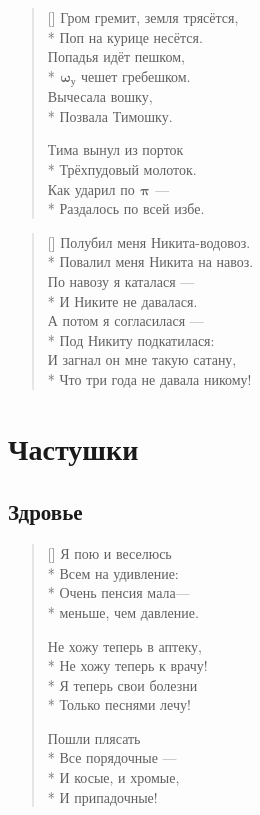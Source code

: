 \documentclass[a4paper,oneside,14pt]{scrbook}
\newcommand{\myPiz}[2]{$^{\text{#1}}${\large{$\boldsymbol{\pi}$}}$_{\text{#2}}$}
\newcommand{\myAss}[2]{$^{\text{#1}}${\large{$\boldsymbol{\omega}$}}$_{\text{#2}}$}
\begin{document}
    \settowidth{\versewidth}{Гром гремит, земля трясётся}
    \begin{verse}[\versewidth]
        Гром гремит, земля трясётся,\\*
        Поп на курице несётся.\\
        Попадья идёт пешком,\\*
        {\myAss{}{у}} чешет гребешком.\\
        Вычесала вошку,\\*
        Позвала Тимошку.
        
        Тима вынул из порток\\*
        Трёхпудовый молоток.\\
        Как ударил по {\myPiz{}{}} ---\\*
        Раздалось по всей избе.
    \end{verse}    

    
    \settowidth{\versewidth}{И загнал он мне такую сатану}
    \begin{verse}[\versewidth]
        Полубил меня Никита-водовоз.\\*
        Повалил меня Никита на навоз.\\
        \vin По навозу я каталася ---\\*
        \vin И Никите не давалася.\\
        А потом я согласилася ---\\*
        Под Никиту подкатилася:\\
        \vin И загнал он мне такую сатану,\\*
        \vin Что три года не давала никому!
    \end{verse}

    
    \chapter{Частушки}
    
    \section{Здровье}
    
    \settowidth{\versewidth}{Я пою и веселюсь}
    \begin{verse}[\versewidth]
        Я пою и веселюсь\\*
        Всем на удивление:\\*
        Очень пенсия мала---\\*
        меньше, чем давление.
        
        Не хожу теперь в аптеку,\\*
        Не хожу теперь к врачу!\\*
        Я теперь свои болезни\\*
        Только песнями лечу!
        
        Пошли плясать\\*
        Все порядочные ---\\*
        И косые, и хромые,\\*
        И припадочные!
    \end{verse}    
\end{document}

